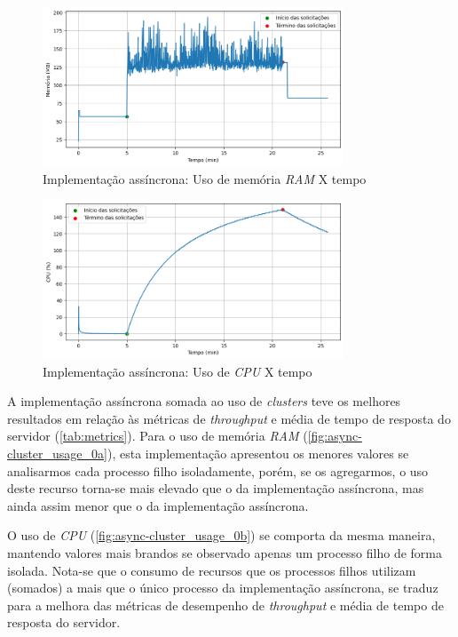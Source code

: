 \documentclass[12pt]{article}
\begin{document}
\begin{figure}[H]
\centering
\includegraphics[width=0.8\textwidth]{images/pt-br/results/async_memory_usage.png}
\caption{Implementação assíncrona: Uso de memória \textit{RAM} X tempo}\label{fig:async_memory_usage}
\end{figure}



\begin{figure}[H]
\centering
\includegraphics[width=0.8\textwidth]{images/pt-br/results/async_cpu_usage.png}
\caption{Implementação assíncrona: Uso de \textit{CPU} X tempo}\label{fig:async_cpu_usage}
\end{figure}


A implementação assíncrona somada ao uso de \textit{clusters} teve os melhores resultados
em relação às métricas de \textit{throughput} e média de tempo de resposta do servidor (\autoref{tab:metrics}). 
Para o uso de memória \textit{RAM} (\autoref{fig:async-cluster_usage_0a}), esta implementação
apresentou os menores valores se analisarmos cada processo filho isoladamente, porém, se os
agregarmos, o uso deste recurso torna-se mais elevado que o da implementação assíncrona, mas
ainda assim menor que o da implementação assíncrona.

O uso de \textit{CPU} (\autoref{fig:async-cluster_usage_0b}) se comporta da mesma
maneira, mantendo valores mais brandos se observado apenas um processo filho de forma isolada.
Nota-se que o consumo de recursos que os processos filhos utilizam (somados) a mais que o único processo
da implementação assíncrona, se traduz para a melhora das métricas de desempenho de 
\textit{throughput} e média de tempo de resposta do servidor.
\end{document}
